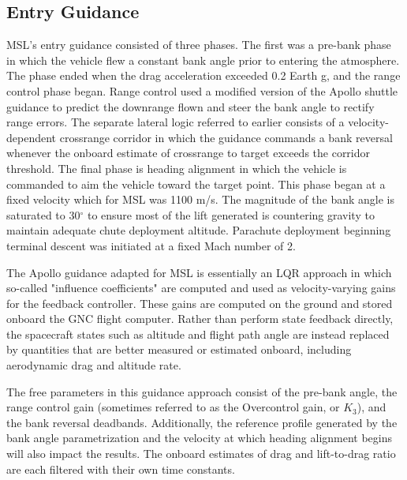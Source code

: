 \documentclass[10pt,a4paper]{article}
\begin{document}
	\subsection{Entry Guidance}
	MSL's entry guidance consisted of three phases. The first was a pre-bank phase in which the vehicle flew a constant bank angle prior to entering the atmosphere. The phase ended when the drag acceleration exceeded 0.2 Earth g, and the range control phase began. Range control used a modified version of the Apollo shuttle guidance to predict the downrange flown and steer the bank angle to rectify range errors. The separate lateral logic referred to earlier consists of a velocity-dependent crossrange corridor in which the guidance commands a bank reversal whenever the onboard estimate of crossrange to target exceeds the corridor threshold. The final phase is heading alignment in which the vehicle is commanded to aim the vehicle toward the target point. This phase began at a fixed velocity which for MSL was 1100 m/s. The magnitude of the bank angle is saturated to 30$^\circ$ to ensure most of the lift generated is countering gravity to maintain adequate chute deployment altitude. Parachute deployment beginning terminal descent was initiated at a fixed Mach number of 2.
	
	The Apollo guidance adapted for MSL is essentially an LQR approach in which so-called "influence coefficients" are computed and used as velocity-varying gains for the feedback controller. These gains are computed on the ground and stored onboard the GNC flight computer. Rather than perform state feedback directly, the spacecraft states such as altitude and flight path angle are instead replaced by quantities that are better measured or estimated onboard, including aerodynamic drag and altitude rate. 
	
	The free parameters in this guidance approach consist of the pre-bank angle, the range control gain (sometimes referred to as the Overcontrol gain, or $ K_3 $), and the bank reversal deadbands. Additionally, the reference profile generated by the bank angle parametrization and the velocity at which heading alignment begins will also impact the results. The onboard estimates of drag and lift-to-drag ratio are each filtered with their own time constants.\cite{MSL_EDL_Overview_JPL}
		
		
\end{document}
